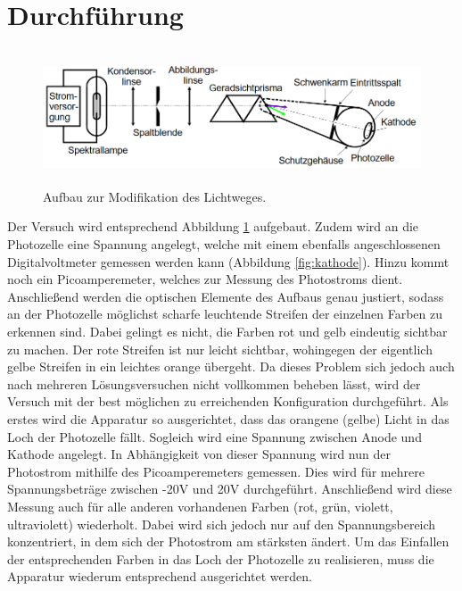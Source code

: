 \section{Durchführung}
\label{sec:Durchführung}

\begin{figure}[H]
  \centering
  \includegraphics[height=4cm]{Versuchsaufbau.PNG}
  \caption{Aufbau zur Modifikation des Lichtweges. \cite{sample}}
  \label{fig:Aufbau}
\end{figure}

Der Versuch wird entsprechend Abbildung \ref{fig:Aufbau} aufgebaut. Zudem wird an
die Photozelle eine Spannung angelegt, welche mit einem ebenfalls angeschlossenen
Digitalvoltmeter gemessen werden kann (Abbildung \ref{fig:kathode}). Hinzu kommt noch
ein Picoamperemeter, welches zur Messung des Photostroms dient.
Anschließend werden die optischen Elemente des Aufbaus genau justiert, sodass
an der Photozelle möglichst scharfe leuchtende Streifen der einzelnen Farben zu erkennen sind.
Dabei gelingt es nicht, die Farben rot und gelb eindeutig sichtbar zu machen.
Der rote Streifen ist nur leicht sichtbar, wohingegen der eigentlich gelbe Streifen
in ein leichtes orange übergeht. Da dieses Problem sich jedoch auch nach mehreren
Lösungsversuchen nicht vollkommen beheben lässt, wird der Versuch mit der best möglichen
zu erreichenden Konfiguration durchgeführt.
Als erstes wird die Apparatur so ausgerichtet, dass das orangene (gelbe) Licht in
das Loch der Photozelle fällt. Sogleich wird eine Spannung zwischen Anode und Kathode angelegt.
In Abhängigkeit von dieser Spannung wird nun der Photostrom mithilfe des Picoamperemeters gemessen.
Dies wird für mehrere Spannungsbeträge zwischen -20V und 20V durchgeführt. Anschließend wird diese
Messung auch für alle anderen vorhandenen Farben (rot, grün, violett, ultraviolett) wiederholt.
Dabei wird sich jedoch nur auf den Spannungsbereich konzentriert, in dem sich der Photostrom am
stärksten ändert. Um das Einfallen der entsprechenden Farben in das Loch der Photozelle zu realisieren,
muss die Apparatur wiederum entsprechend ausgerichtet werden.

